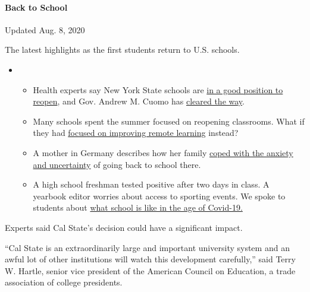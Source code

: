 \hypertarget{back-to-school}{%
\paragraph{Back to School}\label{back-to-school}}

Updated Aug. 8, 2020

The latest highlights as the first students return to U.S. schools.

\begin{itemize}
\item
  \begin{itemize}
  \tightlist
  \item
    Health experts say New York State schools are
    \href{https://www.nytimes.com/2020/08/07/health/coronavirus-ny-schools-reopen.html?action=click\&pgtype=Article\&state=default\&region=MAIN_CONTENT_2\&context=storylines_keepup}{in
    a good position to reopen}, and Gov. Andrew M. Cuomo has
    \href{https://www.nytimes.com/2020/08/07/nyregion/cuomo-schools-reopening.html?action=click\&pgtype=Article\&state=default\&region=MAIN_CONTENT_2\&context=storylines_keepup}{cleared
    the way}.
  \item
    Many schools spent the summer focused on reopening classrooms. What
    if they had
    \href{https://www.nytimes.com/2020/08/07/us/remote-learning-fall-2020.html?action=click\&pgtype=Article\&state=default\&region=MAIN_CONTENT_2\&context=storylines_keepup}{focused
    on improving remote learning} instead?
  \item
    A mother in Germany describes how her family
    \href{https://www.nytimes.com/2020/08/07/parenting/germany-schools-reopening-children.html?action=click\&pgtype=Article\&state=default\&region=MAIN_CONTENT_2\&context=storylines_keepup}{coped
    with the anxiety and uncertainty} of going back to school there.
  \item
    A high school freshman tested positive after two days in class. A
    yearbook editor worries about access to sporting events. We spoke to
    students about
    \href{https://www.nytimes.com/2020/08/06/us/coronavirus-students.html?action=click\&pgtype=Article\&state=default\&region=MAIN_CONTENT_2\&context=storylines_keepup}{what
    school is like in the age of Covid-19.}
  \end{itemize}
\end{itemize}

Experts said Cal State's decision could have a significant impact.

``Cal State is an extraordinarily large and important university system
and an awful lot of other institutions will watch this development
carefully,'' said Terry W. Hartle, senior vice president of the American
Council on Education, a trade association of college presidents.

